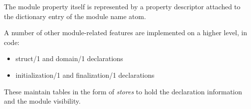 The module property itself is represented by a property descriptor
attached to the dictionary entry of the module name atom.

A number of other module-related features are implemented on a higher
level, in {\eclipse} code:
\begin{itemize}
\item struct/1 and domain/1 declarations
\item initialization/1 and finalization/1 declarations
\end{itemize}
These maintain tables in the form of {\eclipse} {\em stores} to hold
the declaration information and the module visibility.

